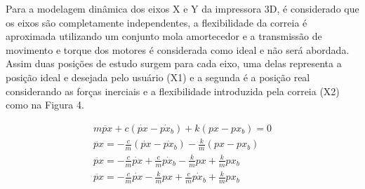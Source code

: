Para a modelagem dinâmica dos eixos X e Y da impressora 3D, 
é considerado que os eixos são completamente independentes, 
a flexibilidade da correia é aproximada utilizando um conjunto 
mola amortecedor e a transmissão de movimento e torque dos 
motores é considerada como ideal e não será abordada.
Assim duas posições de estudo surgem para cada eixo, uma delas 
representa a posição ideal e desejada pelo usuário (X1) e a 
segunda é a posição real considerando as forças inerciais e a 
flexibilidade introduzida pela correia (X2) como na Figura 4.


\begin{multline}
    \label{eq:mov_impressora}
    m \ddot{px} + c(\dot{px} - \dot{px_b}) + k(px-px_b) = 0 \\
    \ddot{px}  = - \frac{c}{m}(\dot{px} - \dot{px_b}) - \frac{k}{m}(px-px_b) \\
    \ddot{px}  = - \frac{c}{m} \dot{px} + \frac{c}{m} \dot
    {px_b} - \frac{k}{m} px + \frac{k}{m} px_b \\
    \ddot{px}  = - \frac{c}{m} \dot{px} - \frac{k}{m} px + \frac{c}{m} \dot{px_b} + \frac{k}{m} px_b
\end{multline}


